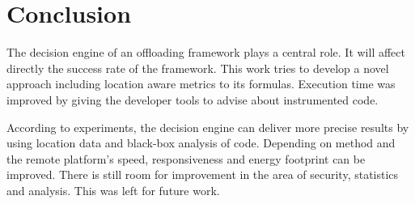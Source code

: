 \documentclass[10pt, conference, letterpaper]{IEEEtran}
\begin{document}
  \section{Conclusion}

  The decision engine of an offloading framework plays a central role. It will affect directly the success rate of the framework. This work tries to develop a novel approach including location aware metrics to its formulas. Execution time was improved by giving the developer tools to advise about instrumented code.

  According to experiments, the decision engine can deliver more precise results by using location data and black-box analysis of code. Depending on method and the remote platform's speed, responsiveness and energy footprint can be improved. There is still room for improvement in the area of security, statistics and analysis. This was left for future work.





\end{document}
